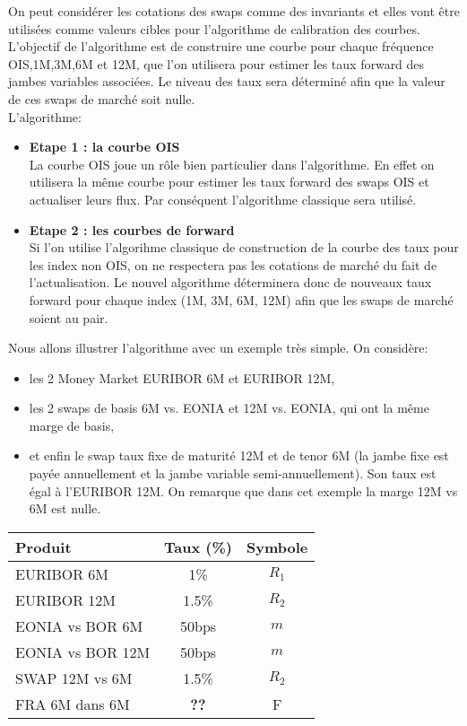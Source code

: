 \documentclass{article}
\begin{document}
On peut considérer les cotations des swaps comme des invariants et elles vont être utilisées comme valeurs cibles pour l'algorithme de calibration des courbes. L'objectif de l'algorithme est de construire une courbe pour chaque fréquence OIS,1M,3M,6M et 12M, que l'on utilisera pour estimer les taux forward des jambes variables associées. Le niveau des taux sera déterminé afin que la valeur de ces swaps de marché soit nulle.\\

L'algorithme:\\
\begin{itemize}
\item \textbf{Etape 1 : la courbe OIS}\\
La courbe OIS joue un rôle bien particulier dans l'algorithme. En effet on utilisera la même courbe pour estimer les taux forward des swaps OIS et actualiser leurs flux. Par conséquent l'algorithme classique sera utilisé.\\
\item{\textbf{Etape 2 : les courbes de forward}}\\
Si l'on utilise l'algorihme classique de construction de la courbe des taux pour les index non OIS, on ne respectera pas les cotations de marché du fait de l'actualisation. Le nouvel algorithme déterminera donc de nouveaux taux forward pour chaque index (1M, 3M, 6M, 12M) afin que les swaps de marché soient au pair.\\ 
\end{itemize}

Nous allons illustrer l'algorithme avec un exemple très simple.
On considère:\\
\begin{itemize}
\item les 2 Money Market EURIBOR 6M et EURIBOR 12M,\\
\item les 2 swaps de basis 6M vs. EONIA et 12M vs. EONIA, qui ont la même marge de basis,\\ 
\item et enfin le swap taux fixe de maturité 12M et de tenor 6M (la jambe fixe est payée annuellement et la jambe variable semi-annuellement). Son taux est égal à l'EURIBOR 12M. On remarque que dans cet exemple la marge 12M vs 6M est nulle.\\
\end{itemize}

\begin{center}
\begin{tabular}{|l|c|c|}
\hline
Produit & Taux (\%) & Symbole\\
\hline
EURIBOR 6M & 1\% & $R_1$ \\
EURIBOR 12M & 1.5\% & $R_2$ \\
EONIA vs BOR 6M & 50bps & $m$\\
EONIA vs BOR 12M & 50bps & $m$\\
SWAP 12M vs 6M & 1.5\% & $R_2$ \\
FRA 6M dans 6M & \textbf{??} & F \\
\hline
\end{tabular}
\end{center}
\end{document}
